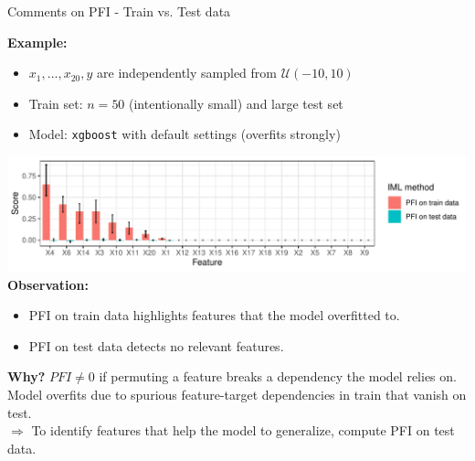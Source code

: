 \documentclass[11pt,compress,t,notes=noshow, aspectratio=169, xcolor=table]{beamer}
\begin{document}
\begin{frame}{Comments on PFI - Train vs. Test data}

\textbf{Example:} %

\begin{itemize}
  \item $x_1, \dots, x_{20}, y$ are independently sampled from $\mathcal{U} (-10, 10)$
  \item Train set: $n = 50$ (intentionally small) and large test set
  \item Model: \texttt{xgboost} with default settings (overfits strongly)
\end{itemize}

  \includegraphics[width=0.9\linewidth]{figure_man/pfi_test_vs_train.pdf}\\
\textbf{Observation:} 
\begin{itemize}
    \item PFI on train data highlights features that the model overfitted to.
    \item PFI on test data detects no relevant features.
\end{itemize} 
\pause
\medskip

\textbf{Why?} $PFI \neq 0$ if permuting a feature breaks a dependency the model relies on. 
Model overfits due to spurious feature-target dependencies in train that vanish on test.\\
$\Rightarrow$ To identify features that help the model to generalize, compute PFI on test data.
  
\end{frame}
\end{document}
